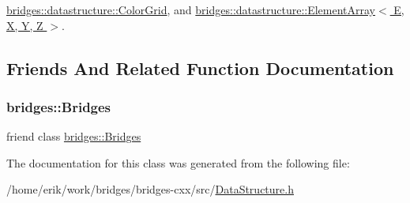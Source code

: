 \hyperlink{classbridges_1_1datastructure_1_1_color_grid_afad945d648b427ca183a1dface8249b7}{bridges\+::datastructure\+::\+Color\+Grid}, and \hyperlink{classbridges_1_1datastructure_1_1_element_array_a22d8c37e88616105cdb7c755f99fdb20}{bridges\+::datastructure\+::\+Element\+Array$<$ E, X, Y, Z $>$}.



\subsection{Friends And Related Function Documentation}
\mbox{\label{classbridges_1_1datastructure_1_1_data_structure_a5c4164a6c5cd1eab3f12871efc2dbe26}} 
\subsubsection{\texorpdfstring{bridges\+::\+Bridges}{bridges::Bridges}}
{\footnotesize\ttfamily friend class \hyperlink{classbridges_1_1_bridges}{bridges\+::\+Bridges}\hspace{0.3cm}{\ttfamily [friend]}}



The documentation for this class was generated from the following file\+:\begin{DoxyCompactItemize}
\item 
/home/erik/work/bridges/bridges-\/cxx/src/\hyperlink{_data_structure_8h}{Data\+Structure.\+h}\end{DoxyCompactItemize}
